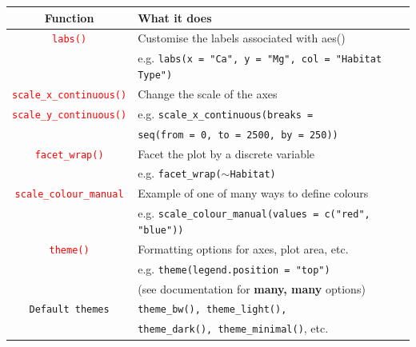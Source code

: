 \documentclass[a4paper,12pt]{article}
\newcommand\code[1]{\textcolor{red}{\texttt{#1}}}
\begin{document}
\begin{table}[h]
	\centering
	\begin{tabular}{cl}
		
		Function & What it does \\ \hline
		\code{labs()} & Customise the labels associated with aes() \\
		              & e.g. \texttt{labs(x = "Ca", y = "Mg", col = "Habitat Type")} \\ \hline
		\code{scale\_x\_continuous()} & Change the scale of the axes \\
		\code{scale\_y\_continuous()} & e.g. \texttt{scale\_x\_continuous(breaks =} \\
		                              & \hspace*{1cm}\texttt{seq(from = 0, to = 2500, by = 250))} \\ \hline
		\code{facet\_wrap()} & Facet the plot by a discrete variable \\
		                  & e.g. \texttt{facet\_wrap($\sim$Habitat)} \\  \hline
		\code{scale\_colour\_manual} & Example of one of many ways to define colours \\
		                           & e.g. \texttt{scale\_colour\_manual(values = c("red", "blue"))} \\ \hline
		\code{theme()} & Formatting options for axes, plot area, etc. \\
		               & e.g. \texttt{theme(legend.position = "top")} \\
		               & (see documentation for \textbf{many, many} options) \\ \hline
		\texttt{Default themes} & \texttt{theme\_bw(), theme\_light(),} \\
		                        & \texttt{theme\_dark(), theme\_minimal()}, etc. \\
		\hline
		
	\end{tabular}
	 
	\label{tbl:ggplot_customisations}
\end{table}
\end{document}
